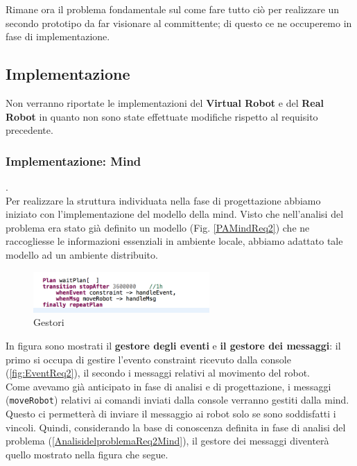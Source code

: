\documentclass{llncs}
\begin{document}
Rimane ora il problema fondamentale sul come fare tutto ci\`o per realizzare un secondo prototipo da far visionare al committente; di questo ce ne occuperemo in fase di implementazione.

\subsection{Implementazione}
\label{ImplementazioneReq2}
Non verranno riportate le implementazioni del \textbf{Virtual Robot} e del \textbf{Real Robot} in quanto non sono state effettuate modifiche rispetto al requisito precedente.
\subsubsection{Implementazione: Mind} .
\label{ImplementazioneReq2Mind}
\vspace*{1ex}
\\
Per realizzare la struttura individuata nella fase di progettazione abbiamo iniziato con l'implementazione del modello della mind. Visto che nell'analisi del problema era stato gi\`a definito un modello (Fig. \hyperref[PAMindReq2]{\ref{PAMindReq2}}) che ne raccogliesse le informazioni essenziali in ambiente locale, abbiamo adattato tale modello ad un ambiente distribuito.
\\
\begin{figure}
    \centering
    \includegraphics[width=0.6\textwidth]{Immagini/Requisito2/MsgReq2.png}
    \caption{Gestori}
    \label{fig:GestMind}
\end{figure}
In figura sono mostrati il \textbf{gestore degli eventi} e \textbf{il gestore dei messaggi}: il primo si occupa di gestire l'evento constraint ricevuto dalla console (\hyperref[fig:EventReq2]{\ref{fig:EventReq2}}), il secondo i messaggi relativi al movimento del robot.\\
Come avevamo gi\`a anticipato in fase di analisi e di progettazione, i messaggi (\texttt{moveRobot}) relativi ai comandi inviati dalla console verranno gestiti dalla mind. Questo ci permetter\`a di inviare il messaggio ai robot solo se sono soddisfatti i vincoli. Quindi, considerando la base di conoscenza definita in fase di analisi del problema (\hyperref[AnalisidelproblemaReq2Mind]{\ref{AnalisidelproblemaReq2Mind}}), il gestore dei messaggi diventer\`a quello mostrato nella figura che segue.\\
\end{document}
